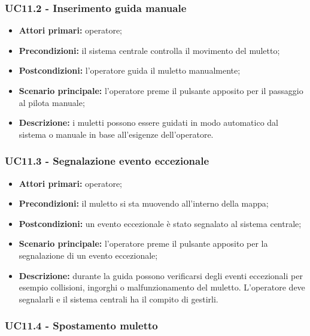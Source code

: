 \subsubsection{UC11.2 - Inserimento guida manuale}
\begin{itemize}
	\item 	\textbf{Attori primari:} operatore;
	\item 	\textbf{Precondizioni:} il sistema centrale controlla il movimento del muletto;
	\item 	\textbf{Postcondizioni:} l’operatore guida il muletto manualmente; 
	\item 	\textbf{Scenario principale:} l’operatore preme il pulsante apposito per il passaggio al pilota manuale;
	\item 	\textbf{Descrizione:} i muletti possono essere guidati in modo automatico dal sistema o manuale in base all’esigenze dell’operatore.
\end{itemize}

\subsubsection{UC11.3 - Segnalazione evento eccezionale}
\begin{itemize}
	\item 	\textbf{Attori primari:} operatore;
	\item 	\textbf{Precondizioni:} il muletto si sta muovendo all’interno della mappa;
	\item 	\textbf{Postcondizioni:} un evento eccezionale è stato segnalato al sistema centrale; 
	\item 	\textbf{Scenario principale:} l’operatore preme il pulsante apposito per la segnalazione di un evento eccezionale;
	\item 	\textbf{Descrizione:} durante la guida possono verificarsi degli eventi eccezionali per esempio collisioni, ingorghi o malfunzionamento del muletto. L’operatore deve segnalarli e il sistema centrali ha il compito di gestirli.

\end{itemize}

\subsubsection{UC11.4 - Spostamento muletto}

